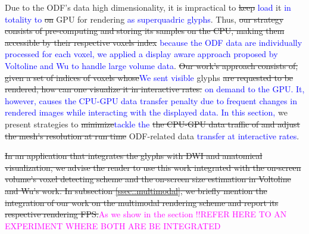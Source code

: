 \documentclass[twoside,twocolumn,10pt]{article}
\begin{document}
Due to the ODF's data high dimensionality, it is impractical to \sout{keep} \textcolor{blue}{load} it \textcolor{blue}{in totality to} \sout{on} GPU for rendering \textcolor{blue}{as superquadric glyphs}. Thus, \sout{our strategy consists of pre-computing and storing its samples on the CPU, making them accessible by their respective voxels index} \textcolor{blue}{because the ODF data are individually processed for each voxel, we applied a display aware approach proposed by Voltoline and Wu to handle large volume data}. \sout{Our work's approach consists of, given a set of indices of voxels whose}\textcolor{blue}{We sent visible} glyphs \sout{are requested to be rendered, how can one visualize it in interactive rates.} \textcolor{blue}{on demand to the GPU. It, however, causes the CPU-GPU data transfer penalty due to frequent changes in rendered images while interacting with the displayed data. In this section,} we present strategies to \sout{minimize}\textcolor{blue}{tackle the} \sout{the CPU-GPU data traffic of and adjust the mesh's resolution at run time} ODF-related data \textcolor{blue}{transfer at interactive rates}.  %



\sout{In an application that integrates the glyphs with DWI and anatomical visualization, we advise the reader to use this work integrated with the on-screen volume's voxel detecting scheme and the on-screen size estimation in Voltoline and Wu's \cite{voltoline2021} work. In subsection \ref{ssec::multimodal}, we briefly mention the integration of our work on the multimodal rendering scheme and report its respective rendering FPS.}\textcolor{magenta}{As we show in the section !!REFER HERE TO AN EXPERIMENT WHERE BOTH ARE BE INTEGRATED}



\end{document}
